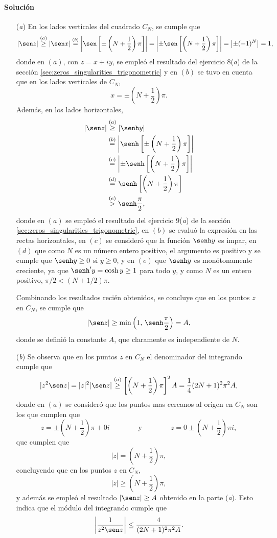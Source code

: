\documentclass[a4paper]{report}
\begin{document}
\paragraph{Solución} 
\begin{enumerate}
 \item[(\textit{a})] En los lados verticales del cuadrado \(C_N\), se cumple que 
 \[
  |\sen z|\overset{(a)}{\geq}|\sen x|\overset{(b)}{=}\left|\sen\left[\pm\left(N+\frac{1}{2}\right)\pi\right]\right|=\left|\pm\sen\left[\left(N+\frac{1}{2}\right)\pi\right]\right|=\left|\pm(-1)^N\right|=1,
 \]
 donde en \((a)\), con \(z=x+iy\), se empleó el resultado del ejercicio 8(\textit{a}) de la sección \ref{sec:zeros_singularities_trigonometric} y en \((b)\) se tuvo en cuenta que en los lados verticales de \(C_N\),
 \[
  x=\pm\left(N+\frac{1}{2}\right)\pi.
 \]
 Además, en los lados horizontales,
 \begin{align*}
  |\sen z|&\overset{(a)}{\geq}|\senh y|\\
   &\overset{(b)}{=}\left|\senh\left[\pm\left(N+\frac{1}{2}\right)\pi\right]\right|\\
   &\overset{(c)}{=}\left|\pm\senh\left[\left(N+\frac{1}{2}\right)\pi\right]\right|\\
   &\overset{(d)}{=}\senh\left[\left(N+\frac{1}{2}\right)\pi\right]\\
   &\overset{(e)}{>}\senh\frac{\pi}{2},
 \end{align*}
 donde en \((a)\) se empleó el resultado del ejercicio 9(\textit{a}) de la sección \ref{sec:zeros_singularities_trigonometric}, en \((b)\) se evaluó la expresión en las rectas horizontales, en \((c)\) se consideró que la función \(\senh y\) es impar, en \((d)\) que como \(N\) es un número entero positivo, el argumento es positivo y se cumple que \(\senh y\geq0\) si \(y\geq0\), y en \((e)\) que \(\senh y\) es monótonamente creciente, ya que \(\senh'y=\cosh y\geq1\) para todo \(y\), y como \(N\) es un entero positivo, \(\pi/2<(N+1/2)\pi\). 
 
 Combinando los resultados recién obtenidos, se concluye que en los puntos \(z\) en \(C_N\), se cumple que 
 \[
  |\sen z|\geq\min\left(1,\,\senh\frac{\pi}{2}\right)=A,
 \]
 donde se definió la constante \(A\), que claramente es independiente de \(N\).
 \item[(\textit{b})] Se observa que en los puntos \(z\) en \(C_N\) el denominador del integrando cumple que 
 \[
  |z^2\sen z|=|z|^2|\sen z|\overset{(a)}{\geq}\left[\left(N+\frac{1}{2}\right)\pi\right]^2A=\frac{1}{4}(2N+1)^2\pi^2A,
 \]
 donde en \((a)\) se consideró que los puntos mas cercanos al origen en \(C_N\) son los que cumplen que 
 \[
  z=\pm\left(N+\frac{1}{2}\right)\pi+0i
  \qquad\qquad\textrm{y}\qquad\qquad
  z=0\pm\left(N+\frac{1}{2}\right)\pi i,
 \]
 que cumplen que 
 \[
  |z|=\left(N+\frac{1}{2}\right)\pi,
 \]
 concluyendo que en los puntos \(z\) en \(C_N\),
 \[
  |z|\geq\left(N+\frac{1}{2}\right)\pi,
 \]
 y además se empleó el resultado \(|\sen z|\geq A\) obtenido en la parte (\textit{a}). Esto indica que el módulo del integrando cumple que 
 \[
  \left|\frac{1}{z^2\sen z}\right|\leq\frac{4}{(2N+1)^2\pi^2A}.
 \]


\end{enumerate}
\end{document}
